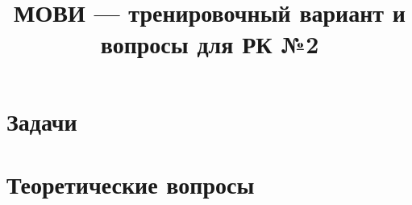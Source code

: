\documentclass[12pt]{article}
\theoremstyle{example}
\theoremstyle{plain}
\theoremstyle{definition}
\theoremstyle{remark}
\numberwithin{remark}{section}
\newcounter{problem}
\begin{document}
\title{МОВИ --- тренировочный вариант и вопросы для РК №2}
\maketitle
\tableofcontents

\section*{Задачи}


\section*{Теоретические вопросы}

\end{document}
